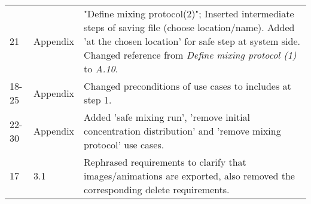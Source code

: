 \begin{longtable}{|l|l|p{11cm}|}
    21 & Appendix & "Define mixing protocol(2)"; Inserted intermediate steps of saving file (choose location/name). Added 'at the chosen location' for safe step at system side. Changed reference from \emph{Define mixing protocol (1)} to \emph{A.10}.\\
    18-25 & Appendix & Changed preconditions of use cases to includes at step 1. \\
    22-30 & Appendix & Added 'safe mixing run', 'remove initial concentration distribution' and 'remove mixing protocol' use cases. \\
    17 & 3.1 & Rephrased requirements to clarify that images/animations are exported, also removed the corresponding delete requirements. \\
\end{longtable}


